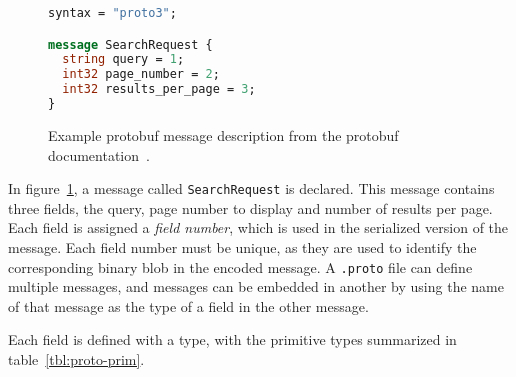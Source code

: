 \documentclass[11pt]{article}
\theoremstyle{definition}
\begin{document}
\begin{figure}[H]
	\begin{lstlisting}[language=proto]
syntax = "proto3";

message SearchRequest {
  string query = 1;
  int32 page_number = 2;
  int32 results_per_page = 3;
}\end{lstlisting}

	\caption{Example protobuf message description from the protobuf documentation~\cite{LanguageGuideProto}.}
	\label{fig:proto-ex}
\end{figure}

In figure~\ref{fig:proto-ex}, a message called \texttt{SearchRequest} is
declared. This message contains three fields, the query, page number to display
and number of results per page. Each field is assigned a \emph{field number},
which is used in the serialized version of the message. Each field number must
be unique, as they are used to identify the corresponding binary blob in the
encoded message. A \texttt{.proto} file can define multiple messages, and
messages can be embedded in another by using the name of that message as the
type of a field in the other message.

Each field is defined with a type, with the primitive types summarized in
table~\ref{tbl:proto-prim}.
\end{document}
